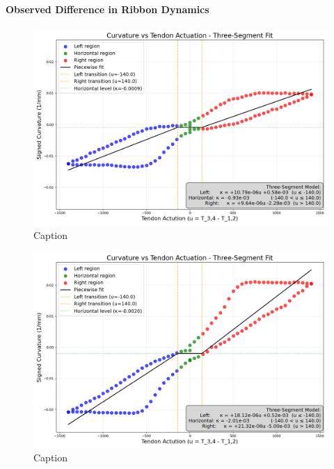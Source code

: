 \paragraph*{Observed Difference in Ribbon Dynamics}
\begin{figure} [H]
    \centering
    \includegraphics[width=0.9\linewidth]{images/ribbonadapter/Ribbonfit_2025-06-27_18-55-42-scaledaxis.png}
    \caption{Caption}
    \label{fig:enter-label}
\end{figure}

\begin{figure} [H]
    \centering
    \includegraphics[width=0.9\linewidth]{images/ribbonadapter/ribbonfit_2025-06-30_09-22-24.png}
    \caption{Caption}
    \label{fig:enter-label}
\end{figure}

